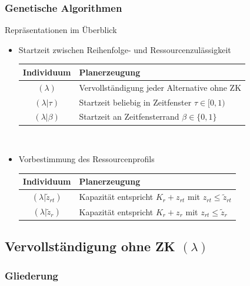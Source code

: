 \begin{frame}
\frametitle{Genetische Algorithmen}
Repräsentationen im Überblick
\begin{itemize}
	\item \small{Startzeit zwischen Reihenfolge- und Ressourcenzulässigkeit}\\[2mm]
	\begin{small}
	\begin{tabular}{cp{7.5cm}}
	\hline
	Individuum & Planerzeugung\\
	\hline
	$(\lambda)$ & Vervollständigung jeder Alternative ohne ZK\\	
	$(\lambda|\tau)$& Startzeit beliebig in Zeitfenster $\tau \in [0,1)$\\
	$(\lambda|\beta)$& Startzeit an Zeitfensterrand $\beta \in \{0,1\}$\\
	\end{tabular}
	\end{small}\\[4mm]
	
	\item \small{Vorbestimmung des Ressourcenprofils}\\[2mm]
	\begin{small}
		\begin{tabular}{cp{7.5cm}}
			\hline
			Individuum & Planerzeugung\\
			\hline
			$(\lambda|\tilde{z}_{rt})$ & Kapazität entspricht $K_r+z_{rt}$ mit $z_{rt} \leq \tilde{z}_{rt}$ \\
			$(\lambda|\tilde{z}_r)$ & Kapazität entspricht $K_r+z_r$ mit $z_{rt} \leq \tilde{z}_{r}$\\
		\end{tabular}
	\end{small}
\end{itemize}
\end{frame}


\subsection{Vervollständigung ohne ZK $(\lambda)$}
\begin{frame}
	\frametitle{Gliederung}
	\tableofcontents[currentsubsection]
\end{frame}


